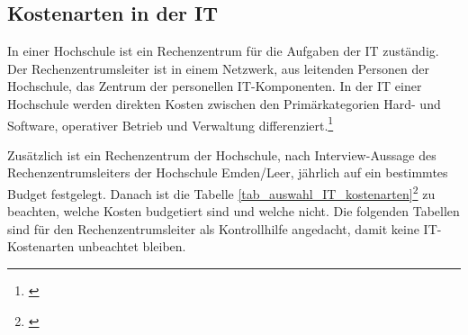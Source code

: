 
\subsection{Kostenarten in der IT}
In einer Hochschule ist ein Rechenzentrum für die Aufgaben der IT zuständig.
Der Rechenzentrumsleiter ist in einem Netzwerk, aus leitenden Personen der Hochschule, das Zentrum der personellen IT-Komponenten. In der IT einer Hochschule werden direkten Kosten zwischen den Primärkategorien Hard- und Software, operativer Betrieb und Verwaltung differenziert.\footnote{\autocite[494]{hansen_business_2009}}

Zusätzlich ist ein Rechenzentrum der Hochschule, nach Interview-Aussage des Rechenzentrumsleiters der Hochschule Emden/Leer, jährlich auf ein bestimmtes Budget festgelegt. Danach ist die Tabelle \ref{tab_auswahl_IT_kostenarten}\footnote{\autocite[493-498]{hansen_business_2009}} zu beachten, welche Kosten budgetiert sind und welche nicht. Die folgenden Tabellen sind für den Rechenzentrumsleiter als Kontrollhilfe angedacht, damit keine IT-Kostenarten unbeachtet bleiben.


